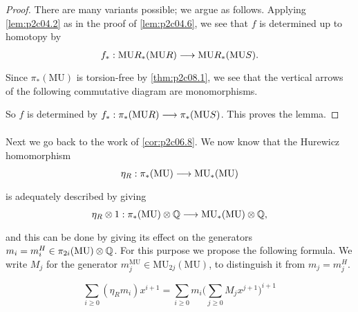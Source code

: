 \documentclass[../main]{subfiles}
\begin{document}
\begin{proof}
There are many variants possible; we argue as follows. Applying \eqref{lem:p2c04.2} as in the proof of \eqref{lem:p2c04.6}, we see that $f$ is determined up to homotopy by \[f_\ast : \te{MU}R_\ast(\te{MU}R) \lar{} \te{MU}R_\ast(\mathrm {MU}S).\] Since $\pi_\ast(\mathrm{MU})$ is torsion-free by \ref{thm:p2c08.1}, we see that the vertical arrows of the following commutative diagram are monomorphisms.

\begin{center}
\end{center}
So $f$ is determined by $f_\ast:\pi_\ast(\mathrm{MU}R)\lar{}\pi_\ast(\mathrm{MU}S)$. This proves the lemma.
\end{proof}

Next we go back to the work of \eqref{cor:p2c06.8}. We now know that the Hurewicz homomorphism \[\eta_R : \pi_\ast (\mathrm{MU}) \lar{} \mathrm {MU}_\ast (\mathrm {MU})\] is adequately described by giving \[\eta_R \otimes 1 : \pi_\ast(\mathrm {MU}) \otimes \bbQ \lar{} \mathrm{MU}_\ast(\mathrm {MU}) \otimes \bbQ,\] and this can be done by giving its effect on the generators $m_i = m_i^H \in \pi_{2i} (\mathrm{MU}) \otimes \mathbb{Q}$. For this purpose we propose the following formula. We write $M_j$ for the generator $m_j^{\mathrm{MU}} \in \mathrm{MU}_{2j} (\mathrm {MU})$, to distinguish it from $m_j = m_j^H$.

\begin{proposition}
\label{prop:p2c09.4}
\[\sum_{i \ge 0} (\eta_R m_i)x^{i + 1} = \sum_{i \ge 0} m_i \bigg(\sum_{j \ge 0} M_j x^{j + 1}\bigg)^{i + 1}\]
\end{proposition}
\end{document}
